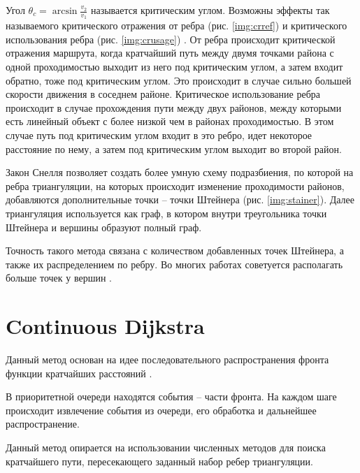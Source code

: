 
Угол $\theta_c = \arcsin\frac{v_2}{v_1}$ называется критическим углом.
Возможны эффекты так называемого критического отражения от ребра
(рис. \ref{img:crref}) и критического использования ребра
(рис. \ref{img:crusage}) \cite{SNELL}. От ребра происходит критической
отражения маршрута, когда кратчайший путь между двумя точками района
с одной проходимостью выходит из него под критическим углом, а затем
входит обратно, тоже под критическим углом. Это происходит в случае
сильно большей скорости движения в соседнем районе. Критическое
использование ребра происходит в случае прохождения пути между двух районов,
между которыми есть линейный объект с более низкой чем в районах проходимостью.
В этом случае путь под критическим углом входит в это ребро, идет некоторое
расстояние по нему, а затем под критическим углом выходит во второй район.


Закон Снелля позволяет создать более умную схему подразбиения, по которой
на ребра триангуляции, на которых происходит изменение проходимости районов,
добавляются дополнительные точки -- точки Штейнера (рис. \ref{img:stainer}).
Далее триангуляция используется как граф, в котором внутри треугольника точки
Штейнера и вершины образуют полный граф.


Точность такого метода связана с количеством добавленных точек Штейнера, а
также их распределением по ребру. Во многих работах советуется располагать
больше точек у вершин \cite{STAINER1, STAINER2}.

\FloatBarrier

\section{Continuous Dijkstra}

Данный метод основан на идее последовательного распространения
фронта функции кратчайших расстояний \cite{CDIJ}.

В приоритетной очереди находятся события -- части
фронта. На каждом шаге происходит извлечение события из
очереди, его обработка и дальнейшее распространение.

Данный метод опирается на использовании численных методов
для поиска кратчайшего пути, пересекающего заданный набор ребер триангуляции.

